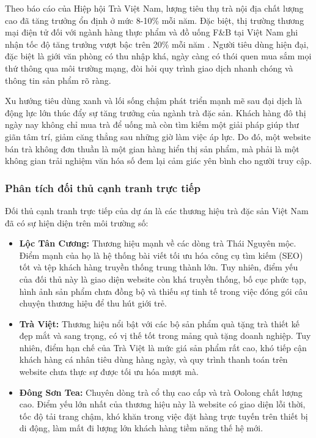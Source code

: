 Theo báo cáo của Hiệp hội Trà Việt Nam, lượng tiêu thụ trà nội địa chất lượng cao đã tăng trưởng ổn định ở mức 8-10\% mỗi năm. Đặc biệt, thị trường thương mại điện tử đối với ngành hàng thực phẩm và đồ uống F\&B tại Việt Nam ghi nhận tốc độ tăng trưởng vượt bậc trên 20\% mỗi năm \cite{sach_trang_tmdt_2023,vecom_ebi_2026}. Người tiêu dùng hiện đại, đặc biệt là giới văn phòng có thu nhập khá, ngày càng có thói quen mua sắm mọi thứ thông qua môi trường mạng, đòi hỏi quy trình giao dịch nhanh chóng và thông tin sản phẩm rõ ràng.

Xu hướng tiêu dùng xanh và lối sống chậm phát triển mạnh mẽ sau đại dịch là động lực lớn thúc đẩy sự tăng trưởng của ngành trà đặc sản. Khách hàng đô thị ngày nay không chỉ mua trà để uống mà còn tìm kiếm một giải pháp giúp thư giãn tâm trí, giảm căng thẳng sau những giờ làm việc áp lực. Do đó, một website bán trà không đơn thuần là một gian hàng hiển thị sản phẩm, mà phải là một không gian trải nghiệm văn hóa số đem lại cảm giác yên bình cho người truy cập.

\subsubsection{Phân tích đối thủ cạnh tranh trực tiếp}
Đối thủ cạnh tranh trực tiếp của dự án là các thương hiệu trà đặc sản Việt Nam đã có sự hiện diện trên môi trường số:
\begin{itemize}
    \item \textbf{Lộc Tân Cương:} Thương hiệu mạnh về các dòng trà Thái Nguyên mộc. Điểm mạnh của họ là hệ thống bài viết tối ưu hóa công cụ tìm kiếm (SEO) tốt và tệp khách hàng truyền thống trung thành lớn. Tuy nhiên, điểm yếu của đối thủ này là giao diện website còn khá truyền thống, bố cục phức tạp, hình ảnh sản phẩm chưa đồng bộ và thiếu sự tinh tế trong việc đóng gói câu chuyện thương hiệu để thu hút giới trẻ.
    \item \textbf{Trà Việt:} Thương hiệu nổi bật với các bộ sản phẩm quà tặng trà thiết kế đẹp mắt và sang trọng, có vị thế tốt trong mảng quà tặng doanh nghiệp. Tuy nhiên, điểm hạn chế của Trà Việt là mức giá sản phẩm rất cao, khó tiếp cận khách hàng cá nhân tiêu dùng hàng ngày, và quy trình thanh toán trên website chưa thực sự được tối ưu hóa mượt mà.
    \item \textbf{Đông Sơn Tea:} Chuyên dòng trà cổ thụ cao cấp và trà Oolong chất lượng cao. Điểm yếu lớn nhất của thương hiệu này là website có giao diện lỗi thời, tốc độ tải trang chậm, khó khăn trong việc đặt hàng trực tuyến trên thiết bị di động, làm mất đi lượng lớn khách hàng tiềm năng thế hệ mới.
\end{itemize}

